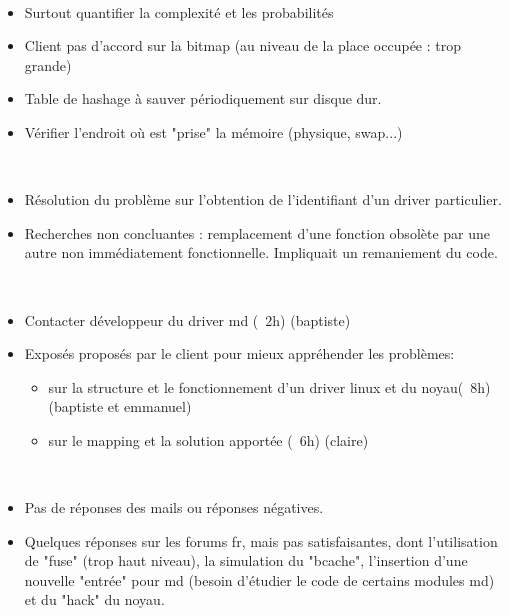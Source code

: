 \documentclass{article}
\begin{document}
\begin{description} \parskip10pt
    \item[Le Mapping] \hfill \\
        \begin{itemize}
            \item Surtout quantifier la complexité et les probabilités
            \item Client pas d'accord sur la bitmap (au niveau de la place occupée : trop grande)
            \item Table de hashage à sauver périodiquement sur disque dur.
            \item Vérifier l'endroit où est "prise" la mémoire (physique, swap...)
        \end{itemize}

    \item[Le dialogue entre drivers] \hfill \\
        \begin{itemize}
            \item Résolution du problème sur l'obtention de l'identifiant d'un driver particulier.
            \item Recherches non concluantes : remplacement d'une fonction obsolète par
            une autre non immédiatement fonctionnelle. Impliquait un remaniement du code. 
        \end{itemize}

    \item[Plan d'action]\hfill  \\
        \begin{itemize}
            \item Contacter développeur du driver md (~2h) (baptiste)
            \item Exposés proposés par le client pour mieux appréhender les problèmes:
                \begin{itemize}
                    \item sur la structure et le fonctionnement d'un driver linux et du noyau(~8h)(baptiste et emmanuel)
                    \item sur le mapping et la solution apportée (~6h) (claire)
                \end{itemize}
        \end{itemize}

    \item[Sur le résultat du précédent plan d'action]\hfill \\
        \begin{itemize}
            \item Pas de réponses des mails ou réponses négatives.
            \item Quelques réponses sur les forums fr, mais pas satisfaisantes, dont l'utilisation
            de "fuse" (trop haut niveau), la simulation du "bcache", l'insertion d'une nouvelle
            "entrée" pour md (besoin d'étudier le code de certains modules md) et du "hack"
            du noyau.
        \end{itemize}
\end{description}
\end{document}
